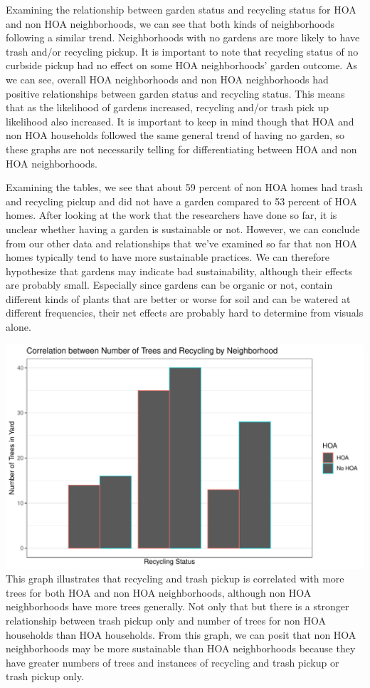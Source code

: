 \documentclass{article}
\begin{document}
Examining the relationship between garden status and recycling status for HOA and non HOA neighborhoods, we can see that both kinds of neighborhoods following a similar trend. Neighborhoods with no gardens are more likely to have trash and/or recycling pickup. It is important to note that recycling status of no curbside pickup had no effect on some HOA neighborhoods' garden outcome. As we can see, overall HOA neighborhoods and non HOA neighborhoods had positive relationships between garden status and recycling status. This means that as the likelihood of gardens increased, recycling and/or trash pick up likelihood also increased. It is important to keep in mind though that HOA and non HOA households followed the same general trend of having no garden, so these graphs are not necessarily telling for differentiating between HOA and non HOA neighborhoods.

Examining the tables, we see that about 59 percent of non HOA homes had trash and recycling pickup and did not have a garden compared to 53 percent of HOA homes. After looking at the work that the researchers have done so far, it is unclear whether having a garden is sustainable or not. However, we can conclude from our other data and relationships that we've examined so far that non HOA homes typically tend to have more sustainable practices. We can therefore hypothesize that gardens may indicate bad sustainability, although their effects are probably small. Especially since gardens can be organic or not, contain different kinds of plants that are better or worse for soil and can be watered at different frequencies, their net effects are probably hard to determine from visuals alone. 

\newpage

\includegraphics{exam1-016}
\newline
This graph illustrates that recycling and trash pickup is correlated with more trees for both HOA and non HOA neighborhoods, although non HOA neighborhoods have more trees generally. Not only that but there is a stronger relationship between trash pickup only and number of trees for non HOA households than HOA households. From this graph, we can posit that non HOA neighborhoods may be more sustainable than HOA neighborhoods because they have greater numbers of trees and instances of recycling and trash pickup or trash pickup only. 
\end{document}
